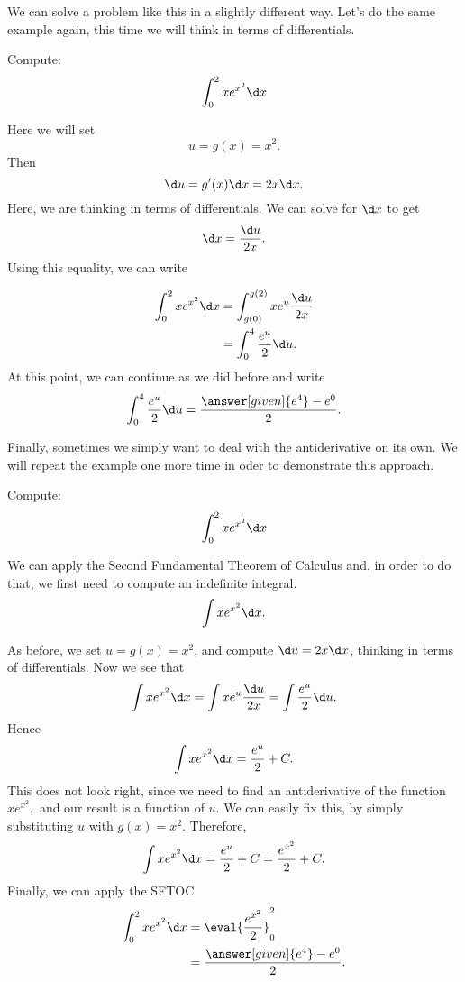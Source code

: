 \documentclass{ximera}
\begin{document}
We can solve a problem like this in a slightly different
way. Let's do the same example again, this time we will think in terms
of differentials.

\begin{example}\label{main example}
Compute:
\[
\int_0^2 x e^{x^2}\d x
\]
\begin{explanation}
Here we will set
\[ u=g(x) = x^2.
\]
 Then 
 \[
 \d u =g'(x)\d x=2x\d x.
 \]
Here, we are thinking in terms of differentials.
We can solve for $\d x$ to get 
\[
\d x = \frac{\d u}{2x}.
\]
Using this equality, we can write

\begin{align*}
\int_0^2 x e^{x^2}\d x &= \int_{g(0)}^{g(2)} x  e^{u} \frac{\d u}{2x}\\
  &= \int_{0}^{4} \frac{e^u}{2}\d u .
\end{align*}
At this point, we can continue as we did before and write
\[
 \int_{0}^{4} \frac{e^u}{2}\d u= \frac{\answer[given]{e^4} -e^0}{2}.
\]
\end{explanation}
\end{example}

Finally, sometimes we simply want to deal with the antiderivative on
its own.  We will repeat the example one more time in oder to demonstrate this approach.

\begin{example}
Compute:
\[
\int_0^2 x e^{x^2}\d x
\]
\begin{explanation}
We can apply the Second Fundamental Theorem of Calculus and, in order to do that, we first need to compute an indefinite integral.
\[
\int  x e^{x^2} \d x.
\]

As before, we set $u=g(x)=x^2$, and compute $\d u =  2x \d x$,
 thinking in terms of differentials. Now we see that
\[
\int   x e^{x^2} \d x = \int x e^{u} \frac{\d u}{2x} = \int \frac{e^{u}}{2}\d u .
\]
Hence 
\[
\int  x e^{x^2} \d x = \frac{e^{u}}{2}+C .
\]
This does not look right, since  we need to find an antiderivative of the function $ x e^{x^2},$ and our result is a function of $u$.
We can easily fix this, by simply substituting $u$ with $g(x)=x^2$.
Therefore,
\[
\int xe^{x^2}\d x =\frac{e^{u}}{2}+C= \frac{e^{x^2}}{2}+C .
\]
Finally, we can apply the SFTOC
\begin{align*}
\int_0^2 x e^{x^2}\d x &=\eval{\frac{e^{x^2}}{2}}_0^2\\
&= \frac{\answer[given]{e^4} -e^0}{2}.
\end{align*}
\end{explanation}
\end{example}
\end{document}
